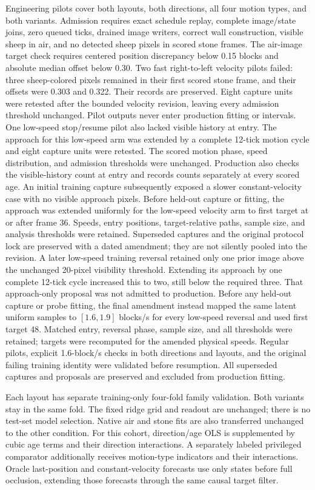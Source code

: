 Engineering pilots cover both layouts, both directions, all four motion types,
and both variants. Admission requires exact schedule replay, complete image/state
joins, zero queued ticks, drained image writers, correct wall construction,
visible sheep in air, and no detected sheep pixels in scored stone frames. The
air-image target check requires centered position discrepancy below 0.15 blocks
and absolute median offset below 0.30. Two fast right-to-left velocity pilots
failed: three sheep-colored pixels remained in their first scored stone frame,
and their offsets were 0.303 and 0.322. Their records are preserved. Eight capture
units were retested after the bounded velocity revision, leaving every admission
threshold unchanged. Pilot outputs never enter production fitting or intervals.
One low-speed stop/resume pilot also lacked visible history at entry. The approach
for this low-speed arm was extended by a complete 12-tick motion cycle and eight
capture units were retested. The scored motion phase, speed distribution, and
admission thresholds were unchanged. Production also checks the visible-history
count at entry and records counts separately at every scored age.
An initial training capture subsequently exposed a slower constant-velocity case
with no visible approach pixels. Before held-out capture or fitting, the approach
was extended uniformly for the low-speed velocity arm to first target at or after
frame 36. Speeds, entry positions, target-relative paths, sample size, and analysis
thresholds were retained. Superseded captures and the original protocol lock are
preserved with a dated amendment; they are not silently pooled into the revision.
A later low-speed training reversal retained only one prior image above the
unchanged 20-pixel visibility threshold. Extending its approach by one complete
12-tick cycle increased this to two, still below the required three. That
approach-only proposal was not admitted to production. Before any held-out
capture or probe fitting, the final amendment instead mapped the same latent
uniform samples to $[1.6,1.9]$ blocks/s for every low-speed reversal and used first
target 48. Matched entry, reversal phase, sample size, and all thresholds were
retained; targets were recomputed for the amended physical speeds. Regular pilots,
explicit 1.6-block/s checks in both directions and layouts, and the original
failing training identity were validated before resumption. All superseded
captures and proposals are preserved and excluded from production fitting.

Each layout has separate training-only four-fold family validation. Both variants
stay in the same fold. The fixed ridge grid and readout are unchanged; there is no
test-set model selection. Native air and stone fits are also transferred unchanged
to the other condition. For this cohort, direction/age OLS is supplemented by
cubic age terms and their direction interactions. A separately labeled privileged
comparator additionally receives motion-type indicators and their interactions.
Oracle last-position and constant-velocity forecasts use only states before full
occlusion, extending those forecasts through the same causal target filter.

